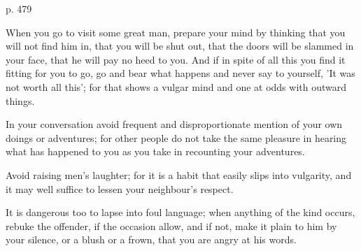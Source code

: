 p. 479

When you  go to visit some  great man, prepare  your mind by thinking  that you
will not find him in, that you will be shut out, that the doors will be slammed
in your face, that he will pay no heed  to you. And if in spite of all this you
find it  fitting for  you to  go, go  and bear  what happens  and never  say to
yourself, 'It was not worth all this'; for  that shows a vulgar mind and one at
odds with outward things.

In your  conversation avoid frequent  and disproportionate mention of  your own
doings or adventures; for other people do not take the same pleasure in hearing
what has happened to you as you take in recounting your adventures.

Avoid  raising  men's laughter;  for  it  is a  habit  that  easily slips  into
vulgarity, and it may well suffice to lessen your neighbour's respect.

It is  dangerous too  to lapse into  foul language; when  anything of  the kind
occurs, rebuke the offender,  if the occasion allow, and if  not, make it plain
to him by your silence, or a blush or a frown, that you are angry at his words.
